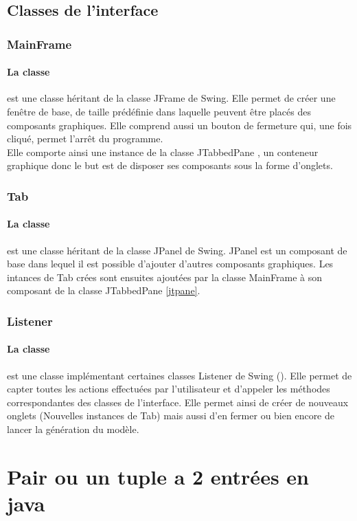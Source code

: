 \subsection{Classes de l'interface}

\subsubsection{MainFrame}

\paragraph{La classe } est une classe héritant de la classe JFrame de Swing. Elle permet de créer une fenêtre de base, de taille prédéfinie dans laquelle peuvent être placés des composants graphiques. Elle comprend aussi un bouton de fermeture qui, une fois cliqué, permet l'arrêt du programme.\\
Elle comporte ainsi une instance de la classe JTabbedPane \label{jtpane}, un conteneur graphique donc le but est de disposer ses composants sous la forme d'onglets.

\subsubsection{Tab}

\paragraph{La classe  } est une classe héritant de la classe JPanel de Swing. JPanel est un composant de base dans lequel il est possible d'ajouter d'autres composants graphiques. Les intances de Tab crées sont ensuites ajoutées par la classe MainFrame à son composant de la classe JTabbedPane \ref{jtpane}.

\subsubsection{Listener}

\paragraph{La classe } est une classe implémentant certaines classes Listener de Swing (). Elle permet de capter toutes les actions effectuées par l'utilisateur et d'appeler les méthodes correspondantes des classes de l'interface. Elle permet ainsi de créer de nouveaux onglets (Nouvelles instances de Tab) mais aussi d'en fermer ou bien encore de lancer la génération du modèle.
\section{Pair ou un tuple a 2 entrées en java}